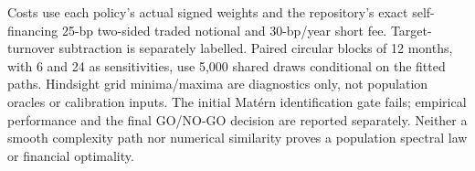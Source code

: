 \documentclass[11pt,letterpaper]{article}
\begin{document}
Costs use each policy's actual signed weights and the repository's exact
self-financing 25-bp two-sided traded notional and 30-bp/year short fee.
Target-turnover subtraction is separately labelled. Paired circular blocks of
12 months, with 6 and 24 as sensitivities, use 5,000 shared draws conditional on
the fitted paths. Hindsight grid minima/maxima are diagnostics only, not
population oracles or calibration inputs. The initial Mat\'ern identification gate
fails; empirical performance and the final GO/NO-GO decision are reported
separately. Neither a smooth complexity path nor numerical similarity proves a
population spectral law or financial optimality.
\end{document}
